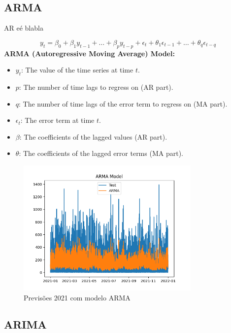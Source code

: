 \subsection{ARMA}

AR eé blabla

\begin{equation} \label{eq:ARMA}  y_t = \beta_0 + \beta_1 y_{t-1} + \dots + \beta_p y_{t-p} + \epsilon_t + \theta_1 \epsilon_{t-1} + \dots + \theta_q \epsilon_{t-q}  \end{equation}
\textbf{ARMA (Autoregressive Moving Average) Model:}
\begin{itemize}
  \item{$y_t$: The value of the time series at time $t$.}
  \item $p$: The number of time lags to regress on (AR part).
  \item $q$: The number of time lags of the error term to regress on (MA part).
  \item $\epsilon_t$: The error term at time $t$.
  \item $\beta$: The coefficients of the lagged values (AR part).
  \item $\theta$: The coefficients of the lagged error terms (MA part).
\end{itemize}


\begin{figure}[H]
    \centering
    \includegraphics[width=0.8\textwidth]{../plots/ARMA_model.png}
    \caption{Previsões 2021 com modelo ARMA}
    \label{fig:ARMA_model}
\end{figure}

\subsection{ARIMA}


